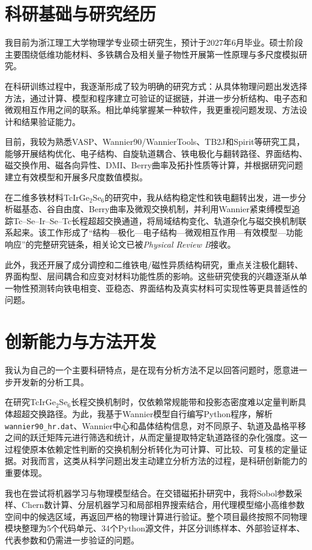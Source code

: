 \section{科研基础与研究经历}

我目前为浙江理工大学物理学专业硕士研究生，预计于2027年6月毕业。硕士阶段主要围绕低维功能材料、多铁耦合及相关量子物性开展第一性原理与多尺度模拟研究。

在科研训练过程中，我逐渐形成了较为明确的研究方式：从具体物理问题出发选择方法，通过计算、模型和程序建立可验证的证据链，并进一步分析结构、电子态和微观相互作用之间的联系。相比单纯掌握某一种软件，我更重视问题发现、方法设计和结果验证能力。

目前，我较为熟悉VASP、Wannier90/WannierTools、TB2J和Spirit等研究工具，能够开展结构优化、电子结构、自旋轨道耦合、铁电极化与翻转路径、界面结构、磁交换作用、磁各向异性、DMI、Berry曲率及拓扑性质等计算，并根据研究问题建立有效模型和开展多尺度数值模拟。

在二维多铁材料TcIrGe$_2$Se$_6$的研究中，我从结构稳定性和铁电翻转出发，进一步分析磁基态、谷自由度、Berry曲率及微观交换机制，并利用Wannier紧束缚模型追踪Tc--Se--Ir--Se--Tc长程超超交换通道，将局域结构变化、轨道杂化与磁交换机制联系起来。该工作形成了“结构—极化—电子结构—微观相互作用—有效模型—功能响应”的完整研究链条，相关论文已被\textit{Physical Review B}接收。

此外，我还开展了成分调控和二维铁电/磁性异质结构研究，重点关注极化翻转、界面构型、层间耦合和应变对材料功能性质的影响。这些研究使我的兴趣逐渐从单一物性预测转向铁电相变、亚稳态、界面结构及真实材料可实现性等更具普适性的问题。

\section{创新能力与方法开发}

我认为自己的一个主要科研特点，是在现有分析方法不足以回答问题时，愿意进一步开发新的分析工具。

在研究TcIrGe$_2$Se$_6$长程交换机制时，仅依赖常规能带和投影态密度难以定量判断具体超超交换路径。为此，我基于Wannier模型自行编写Python程序，解析\texttt{wannier90\_hr.dat}、Wannier中心和晶体结构信息，对不同原子、轨道及晶格平移之间的跃迁矩阵元进行筛选和统计，从而定量提取特定轨道路径的杂化强度。这一过程使原本依赖定性判断的交换机制分析转化为可计算、可比较、可复核的定量证据。对我而言，这类从科学问题出发主动建立分析方法的过程，是科研创新能力的重要体现。

我也在尝试将机器学习与物理模型结合。在交错磁拓扑研究中，我将Sobol参数采样、Chern数计算、分层机器学习和局部相界搜索结合，用代理模型缩小高维参数空间中的候选区域，再返回严格的物理计算进行验证。整个项目最终按照不同物理模块整理为5个代码单元、34个Python源文件，并区分训练样本、外部验证样本、代表参数和仍需进一步验证的问题。

